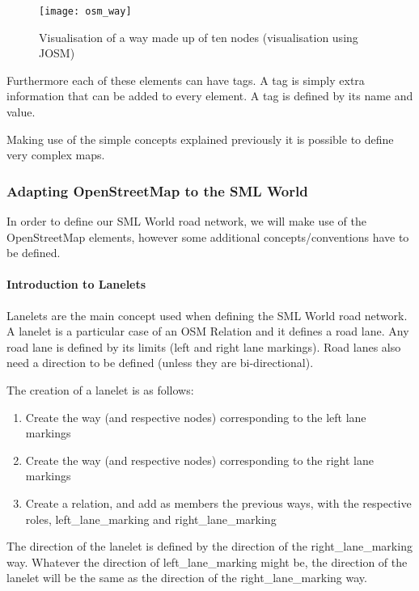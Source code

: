 \begin{figure}[h!]
    \centering
    \texttt{[image: osm\_way]}
    \caption{Visualisation of a way made up of ten nodes (visualisation using JOSM) \label{fig:osm_way} }
\end{figure}

Furthermore each of these elements can have tags. A tag is simply extra information that can be added to every element. A tag is defined by its name and value.

Making use of the simple concepts explained previously it is possible to define very complex maps.

\subsubsection{Adapting OpenStreetMap to the SML World}

In order to define our SML World road network, we will make use of the OpenStreetMap elements, however some additional concepts/conventions have to be defined.

\paragraph{Introduction to Lanelets}

Lanelets are the main concept used when defining the SML World road network. A lanelet is a particular case of an OSM Relation and it defines a road lane. Any road lane is defined by its limits (left and right lane markings). Road lanes also need a direction to be defined (unless they are bi-directional).

The creation of a lanelet is as follows:

\begin{enumerate}
\item Create the way (and respective nodes) corresponding to the left lane markings
\item Create the way (and respective nodes) corresponding to the right lane markings
\item Create a relation, and add as members the previous ways, with the respective roles, left\_lane\_marking and right\_lane\_marking
\end{enumerate}

The direction of the lanelet is defined by the direction of the right\_lane\_marking way. Whatever the direction of left\_lane\_marking might be, the direction of the lanelet will be the same as the direction of the right\_lane\_marking way.

